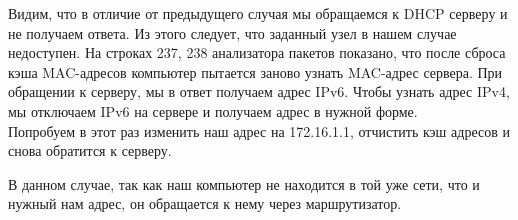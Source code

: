 \documentclass[a4paper,12pt]{article}
\begin{document}
\begin{figure}[H]
\end{figure}
Видим, что в отличие от предыдущего случая мы обращаемся к DHCP серверу и 
не получаем ответа. Из этого следует, что заданный узел в нашем случае недоступен.
На строках 237, 238 анализатора пакетов показано, что после сброса кэша MAC-адресов 
компьютер пытается заново узнать MAC-адрес сервера. 
При обращении к серверу, мы в ответ получаем адрес IPv6.
Чтобы узнать адрес IPv4, мы отключаем IPv6 на сервере и получаем адрес в нужной форме.\\

Попробуем в этот раз изменить наш адрес на 172.16.1.1, отчистить кэш адресов
и снова обратится к серверу.
\begin{figure}[H]
\end{figure}
В данном случае, так как наш компьютер не находится в той уже сети, что и нужный нам адрес, 
он обращается к нему через маршрутизатор.\\
\end{document}
